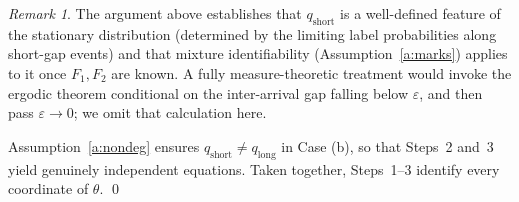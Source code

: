 \documentclass[11pt]{article}
\theoremstyle{remark}
\newtheorem*{remark}{Remark}
\begin{document}
\begin{remark}
The argument above establishes that $q_{\mathrm{short}}$ is a well-defined feature of the stationary distribution (determined by the limiting label probabilities along short-gap events) and that mixture identifiability (Assumption~\ref{a:marks}) applies to it once $F_1,F_2$ are known. A fully measure-theoretic treatment would invoke the ergodic theorem conditional on the inter-arrival gap falling below $\varepsilon$, and then pass $\varepsilon \to 0$; we omit that calculation here.
\end{remark}

Assumption~\ref{a:nondeg} ensures $q_{\mathrm{short}} \ne q_{\mathrm{long}}$ in Case (b), so that Steps~2 and~3 yield genuinely independent equations. Taken together, Steps~1--3 identify every coordinate of $\theta$. \qed
\end{document}
